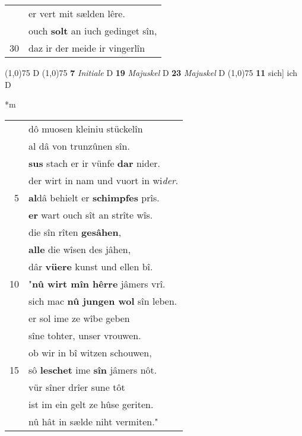 \documentclass[8pt,a4paper,notitlepage]{article}
\begin{document}
\begin{table}[ht]
\begin{minipage}[t]{0.5\linewidth}
\begin{tabular}{rl}
 & er vert mit sælden lêre.\\ 
 & ouch \textbf{solt} an iuch gedinget sîn,\\ 
30 & daz ir der meide ir vingerlîn\\ 
\end{tabular}
\scriptsize
\line(1,0){75} \newline
D \newline
\line(1,0){75} \newline
\textbf{7} \textit{Initiale} D  \textbf{19} \textit{Majuskel} D  \textbf{23} \textit{Majuskel} D  \newline
\line(1,0){75} \newline
\textbf{11} sich] ich D \newline
\end{minipage}
\hspace{0.5cm}
\begin{minipage}[t]{0.5\linewidth}
\small
\begin{center}*m
\end{center}
\begin{tabular}{rl}
 & dô muosen kleiniu stückelîn\\ 
 & al dâ von trunzûnen sîn.\\ 
 & \textbf{sus} stach er ir vünfe \textbf{dar} nider.\\ 
 & der wirt in nam und vuort in wi\textit{der}.\\ 
5 & \textbf{al}dâ behielt er \textbf{schimpfes} prîs.\\ 
 & \textbf{er} wart ouch sît an strîte wîs.\\ 
 & die sîn rîten \textbf{gesâhen},\\ 
 & \textbf{alle} die wîsen des jâhen,\\ 
 & dâr \textbf{vüere} kunst und ellen bî.\\ 
10 & "\textbf{nû wirt mîn hêrre} jâmers vrî.\\ 
 & sich mac \textbf{nû jungen wol} sîn leben.\\ 
 & er sol ime ze wîbe geben\\ 
 & sîne tohter, unser vrouwen.\\ 
 & ob wir in bî witzen schouwen,\\ 
15 & sô \textbf{leschet} ime \textbf{sîn} jâmers nôt.\\ 
 & vür sîner drîer sune tôt\\ 
 & ist im ein gelt ze hûse geriten.\\ 
 & nû hât in sælde niht vermiten."\\ 

\end{tabular}
\end{minipage}
\end{table}
\end{document}
